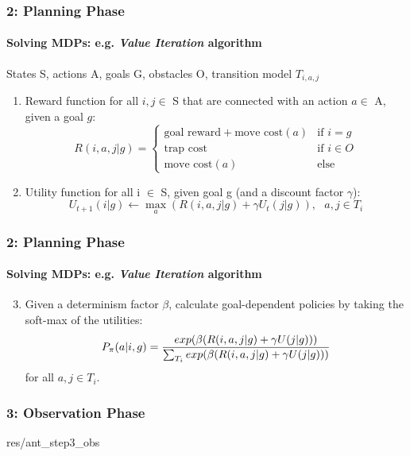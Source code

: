\documentclass[11pt]{beamer}
\begin{document}
\begin{frame}
	\frametitle{2: Planning Phase}
	\framesubtitle{Solving MDPs: e.g. \textit{Value Iteration }algorithm}
	States S, actions A, goals G, obstacles O, transition model $T_{i,a,j}$\\
	\vspace*{1em}
	\begin{enumerate}
		\item Reward function for all $i,j \in$ S that are connected with an action $a \in$ A, given a goal $g$: 
		\begin{equation*}
			R(i,a,j | g)= 
			\begin{cases}
				\text{goal reward} + \text{move cost}(a)& \text{if } i = g\\
				\text{trap cost}              & \text{if } i \in O \\
				\text{move cost}(a) & \text{else}
			\end{cases}
		\end{equation*}
	\item Utility function for all i $\in$ S, given goal g (and a discount factor $\gamma$):
	\begin{equation*}
		U_{t+1}(i|g) \leftarrow \underset{a}{\max} ( R(i,a,j|g) + \gamma U_t(j|g)  ), ~~~a,j \in T_i
	\end{equation*}
	\end{enumerate}	
\end{frame}

\begin{frame}
	\frametitle{2: Planning Phase}
	\framesubtitle{Solving MDPs: e.g. \textit{Value Iteration }algorithm}
	
	\begin{enumerate}
		\setcounter{enumi}{2}
		\item Given a determinism factor $\beta$, calculate goal-dependent policies by taking the soft-max of the utilities:
		\begin{equation*}
			\setcounter{enumi}{3}
			P_\pi(a|i,g) = \frac{exp(  \beta(  R(i,a,j|g) + \gamma U(j|g)  )  )}{ \sum_{T_i}  exp(  \beta(  R(i,a,j|g) + \gamma U(j|g)  )  )}
		\end{equation*}
		for all $a,j \in T_i$. 
	\end{enumerate}

	
\end{frame}

\begin{frame}
	\frametitle{3: Observation Phase}
	\begin{overpic}[width=1.0\textwidth,tics=10]{res/ant_step3_obs}
	\end{overpic}
\end{frame}
\end{document}
